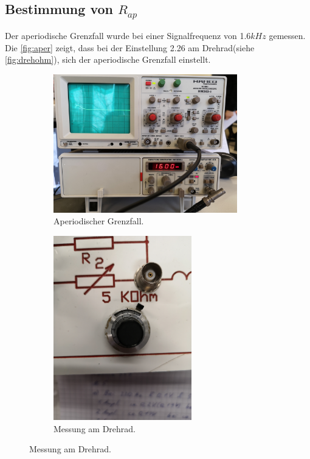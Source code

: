 \newpage
\subsection{Bestimmung von \(R_{ap}\)}
Der aperiodische Grenzfall wurde bei einer Signalfrequenz von 1.6\(kHz\) gemessen.\\
Die \autoref{fig:aper} zeigt, dass bei der Einstellung 2.26 am Drehrad(siehe \autoref{fig:drehohm}), sich der aperiodische Grenzfall einstellt.\\
\begin{figure}
  \centering
  \begin{subfigure}{0.9\textwidth}
    \centering
    \includegraphics[height=6cm]{content/aperiode.jpg}
    \caption{Aperiodischer Grenzfall.}
    \label{fig:aper}
  \end{subfigure}
  \begin{subfigure}{0.9\textwidth}
    \centering
    \includegraphics[height=8cm]{content/aperoiode_ohm.jpg}
    \caption{Messung am Drehrad.}
    \label{fig:drehohm}
  \end{subfigure}
\end{figure}

